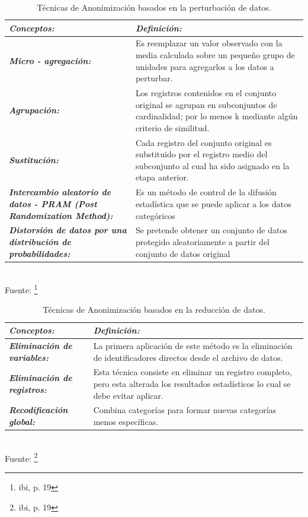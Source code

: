 \documentclass[a4paper,openright,12pt]{book}
\theoremstyle{definition}
\theoremstyle{remark}
\begin{document}
\begin{table}[ht]
\centering
\caption{Técnicas de Anonimización basados en la perturbación de datos.}
\begin{tabular}{>{\centering\arraybackslash}m{3cm} >{\arraybackslash}m{10cm} }
\hline
\textbf{\textit{Conceptos:}} & \textbf{\textit{Definición:}} \\ \hline
\textbf{\textit{Micro - agregación:}} & Es reemplazar un valor observado con la media calculada sobre un pequeño grupo de unidades para agregarlos a los datos a perturbar. \\ \hline
\textbf{\textit{Agrupación:}} & Los registros contenidos en el conjunto original se agrupan en subconjuntos de cardinalidad; por lo menos k mediante algún criterio de similitud.\\ \hline
\textbf{\textit{Sustitución:}} & Cada registro del conjunto original es substituido por el registro medio del subconjunto al cual ha sido asignado en la etapa anterior. \\ \hline
\textbf{\textit{Intercambio aleatorio de datos - PRAM (Post Randomization Method):}} & Es un método de control de la difusión estadística que se puede aplicar a los datos categóricos \\ \hline
\textbf{\textit{Distorsión de datos por una distribución de probabilidades:}} & Se pretende obtener un conjunto de datos protegido aleatoriamente a partir del conjunto de datos original \\ \hline
\end{tabular}
\label{tabla:RobustezPropiedades}
\\Fuente: \footnote{ibi, p. 19}
\end{table}

\begin{table}[htbp]
\centering
\caption{Técnicas de Anonimización basados en la reducción de datos.}
\begin{tabular}{>{\centering\arraybackslash}m{3cm} >{\arraybackslash}m{10cm} }
\hline
\textbf{\textit{Conceptos:}} & \textbf{\textit{Definición:}} \\ \hline
\textbf{\textit{Eliminación de variables:}} & La primera aplicación de este método es la eliminación de identificadores directos desde el archivo de datos. \\ \hline
\textbf{\textit{Eliminación de registros:}} & Esta técnica consiste en eliminar un registro completo, pero esta alterada los resultados estadísticos lo cual se debe evitar aplicar.  \\ \hline
\textbf{\textit{Recodificación global:}} & Combina categorías para formar nuevas categorías menos específicas. \\ \hline
\end{tabular}
\label{tabla:RobustezPropiedades}
\\Fuente: \footnote{ibi, p. 19}
\end{table}
\end{document}
